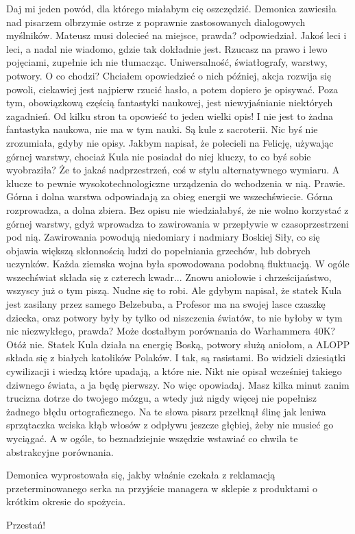 \begin{dialogue}
\ds{} Daj mi jeden powód, dla którego miałabym cię oszczędzić. \dm{} Demonica zawiesiła nad pisarzem olbrzymie ostrze z poprawnie zastosowanych dialogowych myślników.
\ds{} Mateusz musi dolecieć na miejsce, prawda? \dm{} odpowiedział.
\ds{} Jakoś leci i leci, a nadal nie wiadomo, gdzie tak dokładnie jest. Rzucasz na prawo i lewo pojęciami, zupełnie ich nie tłumacząc.
Uniwersalność, światłografy, warstwy, potwory. O co chodzi?
\ds{} Chciałem opowiedzieć o nich później, akcja rozwija się powoli, ciekawiej jest najpierw rzucić hasło, a potem dopiero je opisywać.
Poza tym, obowiązkową częścią fantastyki naukowej, jest niewyjaśnianie niektórych zagadnień.
\ds{} Od kilku stron ta opowieść to jeden wielki opis! I nie jest to żadna fantastyka naukowa, nie ma w tym nauki. Są kule z sacroterii.
\ds{} Nic byś nie zrozumiała, gdyby nie opisy. Jakbym napisał, że polecieli na Felicję, używając górnej warstwy, chociaż Kula nie posiadał do niej kluczy, to co byś sobie wyobraziła?
\ds{} Że to jakaś nadprzestrzeń, coś w stylu alternatywnego wymiaru. A klucze to pewnie wysokotechnologiczne urządzenia do wchodzenia w nią.
\ds{} Prawie. Górna i dolna warstwa odpowiadają za obieg energii we wszechświecie. Górna rozprowadza, a dolna zbiera.
Bez opisu nie wiedziałabyś, że nie wolno korzystać z górnej warstwy, gdyż wprowadza to zawirowania w przepływie w czasoprzestrzeni pod nią.
Zawirowania powodują niedomiary i nadmiary Boskiej Siły, co się objawia większą skłonnością ludzi do popełniania grzechów, lub dobrych uczynków.
Każda ziemska wojna była spowodowana podobną fluktuacją.
W ogóle wszechświat składa się z czterech kwadr...
\ds{} Znowu aniołowie i chrześcijaństwo, wszyscy już o tym piszą. Nudne się to robi.
\ds{} Ale gdybym napisał, że statek Kula jest zasilany przez samego Belzebuba, a Profesor ma na swojej lasce czaszkę dziecka, 
oraz potwory były by tylko od niszczenia światów, to nie byłoby w tym nic niezwykłego, prawda? 
Może dostałbym porównania do Warhammera 40K? Otóż nie. 
Statek Kula działa na energię Boską, potwory służą aniołom, a ALOPP składa się z białych katolików Polaków. 
I tak, są rasistami. Bo widzieli dziesiątki cywilizacji i wiedzą które upadają, a które nie.
Nikt nie opisał wcześniej takiego dziwnego świata, a ja będę pierwszy.
\ds{} No więc opowiadaj. Masz kilka minut zanim trucizna dotrze do twojego mózgu, a wtedy już nigdy więcej nie popełnisz żadnego błędu ortograficznego. 
\dm{} Na te słowa pisarz przełknął ślinę jak leniwa sprzątaczka wciska kłąb włosów z odpływu jeszcze głębiej, żeby nie musieć go wyciągać. \dm{}
A w ogóle, to beznadziejnie wszędzie wstawiać co chwila te abstrakcyjne porównania.
\end{dialogue}
Demonica wyprostowała się, jakby właśnie czekała z reklamacją przeterminowanego serka na przyjście managera w sklepie z produktami o krótkim okresie do spożycia.
\begin{dialogue}
\ds{} Przestań!
\end{dialogue} %

